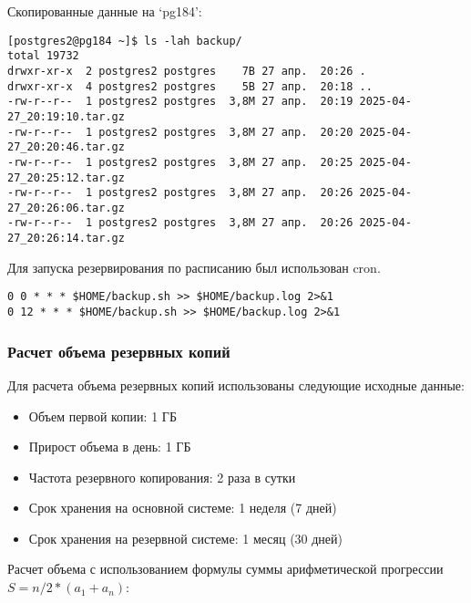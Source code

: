 Скопированные данные на `pg184':

\begin{verbatim}
[postgres2@pg184 ~]$ ls -lah backup/
total 19732
drwxr-xr-x  2 postgres2 postgres    7B 27 апр.  20:26 .
drwxr-xr-x  4 postgres2 postgres    5B 27 апр.  20:18 ..
-rw-r--r--  1 postgres2 postgres  3,8M 27 апр.  20:19 2025-04-27_20:19:10.tar.gz
-rw-r--r--  1 postgres2 postgres  3,8M 27 апр.  20:20 2025-04-27_20:20:46.tar.gz
-rw-r--r--  1 postgres2 postgres  3,8M 27 апр.  20:25 2025-04-27_20:25:12.tar.gz
-rw-r--r--  1 postgres2 postgres  3,8M 27 апр.  20:26 2025-04-27_20:26:06.tar.gz
-rw-r--r--  1 postgres2 postgres  3,8M 27 апр.  20:26 2025-04-27_20:26:14.tar.gz
\end{verbatim}

Для запуска резервирования по расписанию был использован cron.

\begin{verbatim}
0 0 * * * $HOME/backup.sh >> $HOME/backup.log 2>&1
0 12 * * * $HOME/backup.sh >> $HOME/backup.log 2>&1
\end{verbatim}

\subsubsection{Расчет объема резервных копий}

Для расчета объема резервных копий использованы следующие исходные данные:
\begin{itemize}
    \item Объем первой копии: 1 ГБ
    \item Прирост объема в день: 1 ГБ
    \item Частота резервного копирования: 2 раза в сутки
    \item Срок хранения на основной системе: 1 неделя (7 дней)
    \item Срок хранения на резервной системе: 1 месяц (30 дней)
\end{itemize}

Расчет объема с использованием формулы суммы арифметической прогрессии \(S = n/2 * (a_1 + a_n)\):

